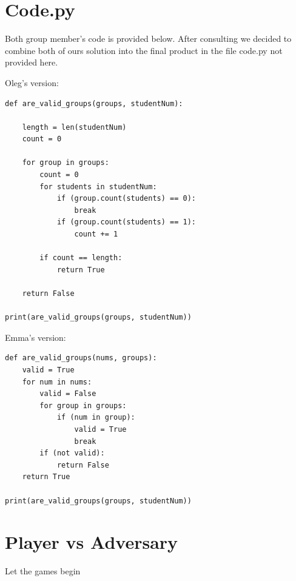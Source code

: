 \documentclass[twocolumn, 10pt]{article}
\begin{document}
\section{Code.py}

Both group member's code is provided below. After consulting we decided to combine both of ours solution into the final product in the file code.py not provided here.

Oleg's version:

\footnotesize
\begin{verbatim}
def are_valid_groups(groups, studentNum):

    length = len(studentNum)
    count = 0
    
    for group in groups:
        count = 0
        for students in studentNum:
            if (group.count(students) == 0):
                break
            if (group.count(students) == 1):
                count += 1
        
        if count == length:
            return True
        
    return False

print(are_valid_groups(groups, studentNum))
\end{verbatim}
\normalsize

Emma's version:

\footnotesize
\begin{verbatim}
def are_valid_groups(nums, groups):
    valid = True
    for num in nums:
        valid = False
        for group in groups:
            if (num in group): 
                valid = True
                break
        if (not valid):
            return False
    return True

print(are_valid_groups(groups, studentNum))
\end{verbatim}
\normalsize

\section{Player vs Adversary}
Let the games begin
\end{document}
